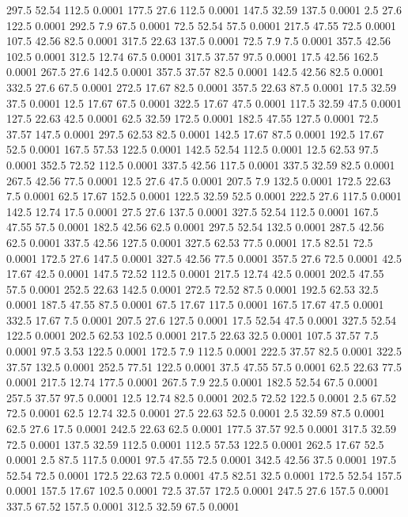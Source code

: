 297.5	52.54	112.5	0.0001
177.5	27.6	112.5	0.0001
147.5	32.59	137.5	0.0001
2.5	27.6	122.5	0.0001
292.5	7.9	67.5	0.0001
72.5	52.54	57.5	0.0001
217.5	47.55	72.5	0.0001
107.5	42.56	82.5	0.0001
317.5	22.63	137.5	0.0001
72.5	7.9	7.5	0.0001
357.5	42.56	102.5	0.0001
312.5	12.74	67.5	0.0001
317.5	37.57	97.5	0.0001
17.5	42.56	162.5	0.0001
267.5	27.6	142.5	0.0001
357.5	37.57	82.5	0.0001
142.5	42.56	82.5	0.0001
332.5	27.6	67.5	0.0001
272.5	17.67	82.5	0.0001
357.5	22.63	87.5	0.0001
17.5	32.59	37.5	0.0001
12.5	17.67	67.5	0.0001
322.5	17.67	47.5	0.0001
117.5	32.59	47.5	0.0001
127.5	22.63	42.5	0.0001
62.5	32.59	172.5	0.0001
182.5	47.55	127.5	0.0001
72.5	37.57	147.5	0.0001
297.5	62.53	82.5	0.0001
142.5	17.67	87.5	0.0001
192.5	17.67	52.5	0.0001
167.5	57.53	122.5	0.0001
142.5	52.54	112.5	0.0001
12.5	62.53	97.5	0.0001
352.5	72.52	112.5	0.0001
337.5	42.56	117.5	0.0001
337.5	32.59	82.5	0.0001
267.5	42.56	77.5	0.0001
12.5	27.6	47.5	0.0001
207.5	7.9	132.5	0.0001
172.5	22.63	7.5	0.0001
62.5	17.67	152.5	0.0001
122.5	32.59	52.5	0.0001
222.5	27.6	117.5	0.0001
142.5	12.74	17.5	0.0001
27.5	27.6	137.5	0.0001
327.5	52.54	112.5	0.0001
167.5	47.55	57.5	0.0001
182.5	42.56	62.5	0.0001
297.5	52.54	132.5	0.0001
287.5	42.56	62.5	0.0001
337.5	42.56	127.5	0.0001
327.5	62.53	77.5	0.0001
17.5	82.51	72.5	0.0001
172.5	27.6	147.5	0.0001
327.5	42.56	77.5	0.0001
357.5	27.6	72.5	0.0001
42.5	17.67	42.5	0.0001
147.5	72.52	112.5	0.0001
217.5	12.74	42.5	0.0001
202.5	47.55	57.5	0.0001
252.5	22.63	142.5	0.0001
272.5	72.52	87.5	0.0001
192.5	62.53	32.5	0.0001
187.5	47.55	87.5	0.0001
67.5	17.67	117.5	0.0001
167.5	17.67	47.5	0.0001
332.5	17.67	7.5	0.0001
207.5	27.6	127.5	0.0001
17.5	52.54	47.5	0.0001
327.5	52.54	122.5	0.0001
202.5	62.53	102.5	0.0001
217.5	22.63	32.5	0.0001
107.5	37.57	7.5	0.0001
97.5	3.53	122.5	0.0001
172.5	7.9	112.5	0.0001
222.5	37.57	82.5	0.0001
322.5	37.57	132.5	0.0001
252.5	77.51	122.5	0.0001
37.5	47.55	57.5	0.0001
62.5	22.63	77.5	0.0001
217.5	12.74	177.5	0.0001
267.5	7.9	22.5	0.0001
182.5	52.54	67.5	0.0001
257.5	37.57	97.5	0.0001
12.5	12.74	82.5	0.0001
202.5	72.52	122.5	0.0001
2.5	67.52	72.5	0.0001
62.5	12.74	32.5	0.0001
27.5	22.63	52.5	0.0001
2.5	32.59	87.5	0.0001
62.5	27.6	17.5	0.0001
242.5	22.63	62.5	0.0001
177.5	37.57	92.5	0.0001
317.5	32.59	72.5	0.0001
137.5	32.59	112.5	0.0001
112.5	57.53	122.5	0.0001
262.5	17.67	52.5	0.0001
2.5	87.5	117.5	0.0001
97.5	47.55	72.5	0.0001
342.5	42.56	37.5	0.0001
197.5	52.54	72.5	0.0001
172.5	22.63	72.5	0.0001
47.5	82.51	32.5	0.0001
172.5	52.54	157.5	0.0001
157.5	17.67	102.5	0.0001
72.5	37.57	172.5	0.0001
247.5	27.6	157.5	0.0001
337.5	67.52	157.5	0.0001
312.5	32.59	67.5	0.0001
